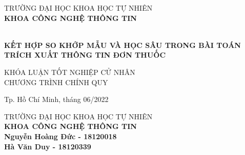\begin{titlepage}

    \begin{center}
    TRƯỜNG ĐẠI HỌC KHOA HỌC TỰ NHIÊN\\
    \textbf{KHOA CÔNG NGHỆ THÔNG TIN}\\[2cm]


    { \Large \bfseries \tenSV\\[2cm] } 


    { \Large \bfseries KẾT HỢP SO KHỚP MẪU VÀ HỌC SÂU TRONG BÀI TOÁN TRÍCH XUẤT THÔNG TIN ĐƠN THUỐC\\[3cm]} 

        

    \large KHÓA LUẬN TỐT NGHIỆP CỬ NHÂN\\
    \large CHƯƠNG TRÌNH CHÍNH QUY\\



    \vfill
    Tp. Hồ Chí Minh, tháng 06/2022

    \end{center}

    \pagebreak

    \begin{center}

    TRƯỜNG ĐẠI HỌC KHOA HỌC TỰ NHIÊN\\
    \textbf{KHOA CÔNG NGHỆ THÔNG TIN}\\[2cm]

    {\large \bfseries Nguyễn Hoàng Đức - 18120018\\} 
    {\large \bfseries Hà Văn Duy - 18120339\\[2cm]}


\end{center}
\end{titlepage}
